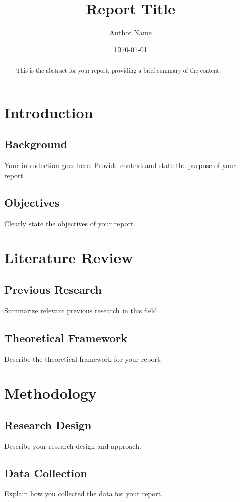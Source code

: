 \documentclass[12pt, letterpaper]{report}
\title{Report Title}
\author{Author Name}
\date{\today}
\begin{document}
\maketitle

\begin{abstract}
This is the abstract for your report, providing a brief summary of the content.
\end{abstract}

\tableofcontents

\chapter{Introduction}
\section{Background}
Your introduction goes here. Provide context and state the purpose of your report.

\section{Objectives}
Clearly state the objectives of your report.

\chapter{Literature Review}
\section{Previous Research}
Summarize relevant previous research in this field.

\section{Theoretical Framework}
Describe the theoretical framework for your report.

\chapter{Methodology}
\section{Research Design}
Describe your research design and approach.

\section{Data Collection}
Explain how you collected the data for your report.
\end{document}

